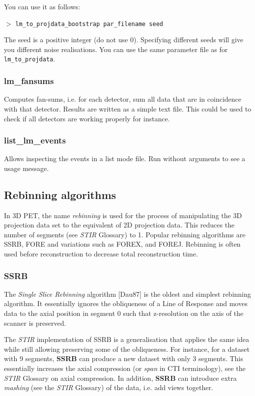 \documentclass{article}
\newcommand{\cmdline}[1]{\par \noindent $>$ \texttt{#1}\par}
\begin{document}
You can use it as follows:

\cmdline{lm\_to\_projdata\_bootstrap par\_filename seed}

The seed is a positive integer (do not use $0$). Specifying different seeds will give you different noise realisations.
You can use the same parameter file as for \texttt{lm\_to\_projdata}.

\subsubsection{
lm\_fansums}
Computes fan-sums, i.e. for each detector, sum all data that are in coincidence with that detector.
Results are written as a simple text file. This could be used to check if all detectors are working
properly for instance.

\subsubsection{
list\_lm\_events}
Allows inspecting the events in a list mode file. Run without arguments to see a usage message.

\subsection{
Rebinning algorithms}

In 3D PET, the name \textit{rebinning} is used for the 
process of manipulating the 3D projection data set to the equivalent 
of 2D projection data. This reduces the number of segments (see 
\textit{STIR} Glossary) to 1. Popular rebinning algorithms are SSRB, FORE 
and variations such as FOREX, and FOREJ. Rebinning is often used 
before reconstruction to decrease total reconstruction time.


\subsubsection{
SSRB}
\label{sec:SSRB}
The \textit{Single Slice Rebinning} algorithm [Dau87] is the oldest 
and simplest rebinning algorithm. It essentially ignores the 
obliqueness of a Line of Response and moves data to the axial 
position in segment 0 such that z-resolution on the axis of the 
scanner is preserved.


The \textit{STIR} implementation of SSRB is a generalisation that applies 
the same idea while still allowing preserving some of the obliqueness. 
For instance, for a dataset with 9 segments, \textbf{SSRB} can produce 
a new dataset with only 3 segments. This essentially increases 
the axial compression (or \textit{span} in CTI terminology), see the 
\textit{STIR} Glossary on axial compression. In addition, \textbf{SSRB} can 
introduce extra \textit{mashing} (see the \textit{STIR} Glossary) of the data, 
i.e. add views together.
\end{document}
